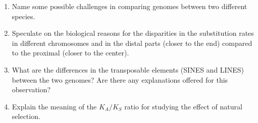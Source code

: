 \documentclass[
]{book}
\theoremstyle{definition}
\theoremstyle{definition}
\theoremstyle{definition}
\theoremstyle{remark}
\begin{document}
\begin{enumerate}
\def\labelenumi{\arabic{enumi}.}
\item
  Name some possible challenges in comparing genomes between two different species.
\item
  Speculate on the biological reasons for the disparities in the substitution rates in different chromosomes and in the distal parts (closer to the end) compared to the proximal (closer to the center).
\item
  What are the differences in the transposable elements (SINES and LINES) between the two genomes? Are there any explanations offered for this observation?
\item
  Explain the meaning of the \(K_A/K_S\) ratio for studying the effect of natural selection.
\end{enumerate}

  
\end{document}
